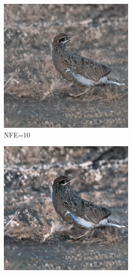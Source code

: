 \documentclass{article}
\begin{document}
\begin{figure}
    \begin{subfigure}[b]{0.19\linewidth}
    \includegraphics[width=\linewidth]{figures/imagenet256/solver_samples/imagenet256_fm_ot_17_05.png}
    \caption*{NFE=10}
    \end{subfigure}
    \begin{subfigure}[b]{0.19\linewidth}
    \includegraphics[width=\linewidth]{figures/imagenet256/solver_samples/imagenet256_fm_ot_17_10.png}

\end{subfigure}
\end{figure}
\end{document}
